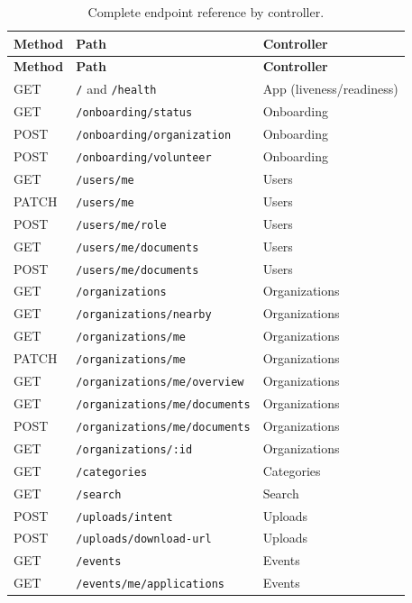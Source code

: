 \begin{longtable}{|p{}|p{}|p{}|}
\caption{Complete endpoint reference by controller.}\label{tab:endpoints}\\\hline
\textbf{Method} & \textbf{Path} & \textbf{Controller}\\\hline
\endfirsthead
\hline
\textbf{Method} & \textbf{Path} & \textbf{Controller}\\\hline
\endhead

GET & \texttt{/} and \texttt{/health} & App (liveness/readiness)\\\hline
GET & \texttt{/onboarding/status} & Onboarding\\\hline
POST & \texttt{/onboarding/organization} & Onboarding\\\hline
POST & \texttt{/onboarding/volunteer} & Onboarding\\\hline
GET & \texttt{/users/me} & Users\\\hline
PATCH & \texttt{/users/me} & Users\\\hline
POST & \texttt{/users/me/role} & Users\\\hline
GET & \texttt{/users/me/documents} & Users\\\hline
POST & \texttt{/users/me/documents} & Users\\\hline
GET & \texttt{/organizations} & Organizations\\\hline
GET & \texttt{/organizations/nearby} & Organizations\\\hline
GET & \texttt{/organizations/me} & Organizations\\\hline
PATCH & \texttt{/organizations/me} & Organizations\\\hline
GET & \texttt{/organizations/me/overview} & Organizations\\\hline
GET & \texttt{/organizations/me/documents} & Organizations\\\hline
POST & \texttt{/organizations/me/documents} & Organizations\\\hline
GET & \texttt{/organizations/:id} & Organizations\\\hline
GET & \texttt{/categories} & Categories\\\hline
GET & \texttt{/search} & Search\\\hline
POST & \texttt{/uploads/intent} & Uploads\\\hline
POST & \texttt{/uploads/download-url} & Uploads\\\hline
GET & \texttt{/events} & Events\\\hline
GET & \texttt{/events/me/applications} & Events\\\hline

\end{longtable}
